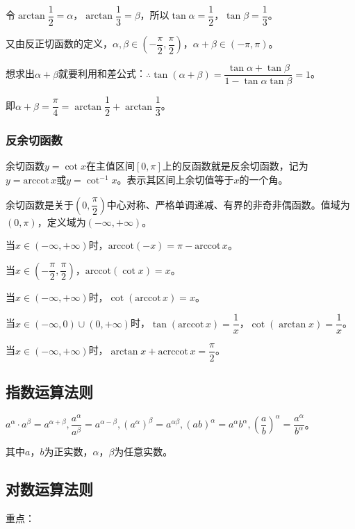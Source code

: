 令$\arctan\dfrac{1}{2}=\alpha$，$\arctan\dfrac{1}{3}=\beta$，所以$\tan\alpha=\dfrac{1}{2}$，$\tan\beta=\dfrac{1}{3}$。

又由反正切函数的定义，$\alpha,\beta\in\left(-\dfrac{\pi}{2},\dfrac{\pi}{2}\right)$，$\alpha+\beta\in(-\pi,\pi)$。

想求出$\alpha+\beta$就要利用和差公式：$\therefore\tan(\alpha+\beta)=\dfrac{\tan\alpha+\tan\beta}{1-\tan\alpha\tan\beta}=1$。

即$\alpha+\beta=\dfrac{\pi}{4}=\arctan\dfrac{1}{2}+\arctan\dfrac{1}{3}$。

\subsubsection{反余切函数}

余切函数$y=\cot x$在主值区间$[0,\pi]$上的反函数就是反余切函数，记为$y=\textrm{arccot}\,x$或$y=\cot^{-1}x$。表示其区间上余切值等于$x$的一个角。

余切函数是关于$\left(0,\dfrac{\pi}{2}\right)$中心对称、严格单调递减、有界的非奇非偶函数。值域为$(0,\pi)$，定义域为$(-\infty,+\infty)$。

当$x\in(-\infty,+\infty)$时，$\textrm{arccot}(-x)=\pi-\textrm{arccot}\,x$。

当$x\in\left(-\dfrac{\pi}{2},\dfrac{\pi}{2}\right)$，$\textrm{arccot}(\cot x)=x$。

当$x\in(-\infty,+\infty)$时，$\cot(\textrm{arccot}\,x)=x$。

当$x\in(-\infty,0)\cup(0,+\infty)$时，$\tan(\textrm{arccot}\,x)=\dfrac{1}{x}$，$\cot(\arctan x)=\dfrac{1}{x}$。

当$x\in(-\infty,+\infty)$时，$\arctan x+\textrm{acrccot}\,x=\dfrac{\pi}{2}$。

\subsection{指数运算法则}

$a^\alpha\cdot a^\beta=a^{\alpha+\beta},\dfrac{a^\alpha}{a^\beta}=a^{\alpha-\beta},(a^\alpha)^\beta=a^{\alpha\beta},(ab)^\alpha=a^\alpha b^\alpha,(\dfrac{a}{b})^\alpha=\dfrac{a^\alpha}{b^\alpha}$。

其中$a$，$b$为正实数，$\alpha$，$\beta$为任意实数。

\subsection{对数运算法则}

重点：


